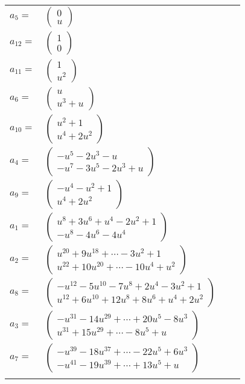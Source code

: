 \documentclass[1p]{elsarticle_modified}
\theoremstyle{definition}
\begin{document}
\begin{tabular}{m{7pt} m{180pt} m{7pt} m{180pt} }
\flushright $a_{5}=$&$\begin{pmatrix}0\\u\end{pmatrix}$ \\
\flushright $a_{12}=$&$\begin{pmatrix}1\\0\end{pmatrix}$ \\
\flushright $a_{11}=$&$\begin{pmatrix}1\\u^2\end{pmatrix}$ \\
\flushright $a_{6}=$&$\begin{pmatrix}u\\u^3+u\end{pmatrix}$ \\
\flushright $a_{10}=$&$\begin{pmatrix}u^2+1\\u^4+2 u^2\end{pmatrix}$ \\
\flushright $a_{4}=$&$\begin{pmatrix}- u^5-2 u^3- u\\- u^7-3 u^5-2 u^3+u\end{pmatrix}$ \\
\flushright $a_{9}=$&$\begin{pmatrix}- u^4- u^2+1\\u^4+2 u^2\end{pmatrix}$ \\
\flushright $a_{1}=$&$\begin{pmatrix}u^8+3 u^6+u^4-2 u^2+1\\- u^8-4 u^6-4 u^4\end{pmatrix}$ \\
\flushright $a_{2}=$&$\begin{pmatrix}u^{20}+9 u^{18}+\cdots-3 u^2+1\\u^{22}+10 u^{20}+\cdots-10 u^4+u^2\end{pmatrix}$ \\
\flushright $a_{8}=$&$\begin{pmatrix}- u^{12}-5 u^{10}-7 u^8+2 u^4-3 u^2+1\\u^{12}+6 u^{10}+12 u^8+8 u^6+u^4+2 u^2\end{pmatrix}$ \\
\flushright $a_{3}=$&$\begin{pmatrix}- u^{31}-14 u^{29}+\cdots+20 u^5-8 u^3\\u^{31}+15 u^{29}+\cdots-8 u^5+u\end{pmatrix}$ \\
\flushright $a_{7}=$&$\begin{pmatrix}- u^{39}-18 u^{37}+\cdots-22 u^5+6 u^3\\- u^{41}-19 u^{39}+\cdots+13 u^5+u\end{pmatrix}$\\&\end{tabular}
\end{document}
